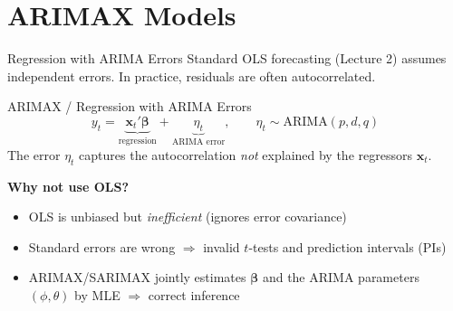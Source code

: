 \documentclass[aspectratio=169, 11pt]{beamer}
\begin{document}
\section{ARIMAX Models}


\begin{frame}{Regression with ARIMA Errors}
  Standard OLS forecasting (Lecture 2) assumes independent errors.
  In practice, residuals are often autocorrelated.
  \begin{definitionbox}{ARIMAX / Regression with ARIMA Errors}
    {\small
    \[
      y_t = \underbrace{\mathbf{x}_t'\boldsymbol{\beta}}_{\text{regression}}
            + \underbrace{\eta_t}_{\text{ARIMA error}},
      \qquad \eta_t \sim \mathrm{ARIMA}(p,d,q)
    \]
    The error $\eta_t$ captures the autocorrelation \emph{not} explained
    by the regressors $\mathbf{x}_t$.}
  \end{definitionbox}
  \textbf{Why not use OLS?}
  \begin{itemize}\small
    \item OLS is unbiased but \emph{inefficient} (ignores error covariance)
    \item Standard errors are wrong $\Rightarrow$ invalid $t$-tests
          and prediction intervals (PIs)
    \item ARIMAX/SARIMAX jointly estimates $\boldsymbol{\beta}$ and
          the ARIMA parameters $(\phi,\theta)$ by MLE
          $\Rightarrow$ correct inference
  \end{itemize}
\end{frame}
\end{document}
